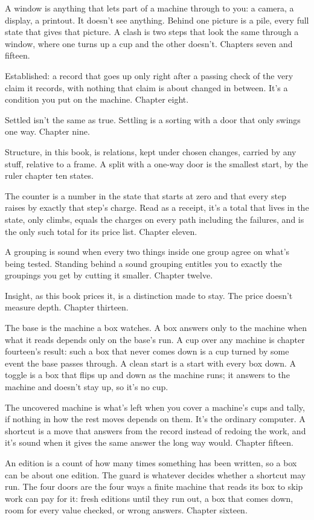 \documentclass[11pt,twoside]{article}
\theoremstyle{thielethm}
\theoremstyle{thieledef}
\theoremstyle{thieledef}
\theoremstyle{thieledef}
\theoremstyle{thielethm}
\theoremstyle{thieleobs}
\theoremstyle{thielethm}
\begin{document}
A window is anything that lets part of a machine through to you: a camera, a display, a printout. It doesn't see anything. Behind one picture is a pile, every full state that gives that picture. A clash is two steps that look the same through a window, where one turns up a cup and the other doesn't. Chapters seven and fifteen.

Established: a record that goes up only right after a passing check of the very claim it records, with nothing that claim is about changed in between. It's a condition you put on the machine. Chapter eight.

Settled isn't the same as true. Settling is a sorting with a door that only swings one way. Chapter nine.

Structure, in this book, is relations, kept under chosen changes, carried by any stuff, relative to a frame. A split with a one-way door is the smallest start, by the ruler chapter ten states.

The counter is a number in the state that starts at zero and that every step raises by exactly that step's charge. Read as a receipt, it's a total that lives in the state, only climbs, equals the charges on every path including the failures, and is the only such total for its price list. Chapter eleven.

A grouping is sound when every two things inside one group agree on what's being tested. Standing behind a sound grouping entitles you to exactly the groupings you get by cutting it smaller. Chapter twelve.

Insight, as this book prices it, is a distinction made to stay. The price doesn't measure depth. Chapter thirteen.

The base is the machine a box watches. A box answers only to the machine when what it reads depends only on the base's run. A cup over any machine is chapter fourteen's result: such a box that never comes down is a cup turned by some event the base passes through. A clean start is a start with every box down. A toggle is a box that flips up and down as the machine runs; it answers to the machine and doesn't stay up, so it's no cup.

The uncovered machine is what's left when you cover a machine's cups and tally, if nothing in how the rest moves depends on them. It's the ordinary computer. A shortcut is a move that answers from the record instead of redoing the work, and it's sound when it gives the same answer the long way would. Chapter fifteen.

An edition is a count of how many times something has been written, so a box can be about one edition. The guard is whatever decides whether a shortcut may run. The four doors are the four ways a finite machine that reads its box to skip work can pay for it: fresh editions until they run out, a box that comes down, room for every value checked, or wrong answers. Chapter sixteen.
\end{document}
